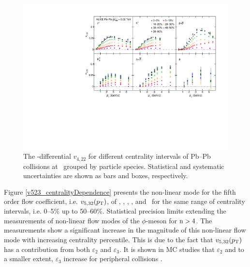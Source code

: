 \begin{figure}[!htb]
\begin{center}
\includegraphics[scale=0.82]{figures/results/All_v422_gap00_CentDep_PID2.pdf}
\end{center}
\caption{The \pT-differential $v_{4,22}$ for different centrality intervals of Pb--Pb collisions at \sNN~grouped by particle species. Statistical and systematic uncertainties are shown as bars and boxes, respectively.}
\label{v422_centralityDependence}
\end{figure}
 
Figure \ref{v523_centralityDependence} presents the non-linear mode for the fifth order flow coefficient, i.e. $v_{5,32}(p_{\rm{T}})$, of \pion, \kaon, \Ks, \proton, and \lambdas~for the same range of centrality intervals, i.e. 0--5\% up to 50--60\%. Statistical precision limits extending the measurements of non-linear flow modes of the $\phi$-meson for ${\rm n}>4$. The measurements show a significant increase in the magnitude of this non-linear flow mode with increasing centrality percentile. This is due to the fact that $v_{5,32}(p_{\rm{T}})$ has a contribution from both $\varepsilon_{2}$ and $\varepsilon_{3}$. It is shown in MC studies that $\varepsilon_{2}$ and to a smaller extent, $\varepsilon_{3}$ increase for peripheral collisions \cite{Alver:2010gr}. 

